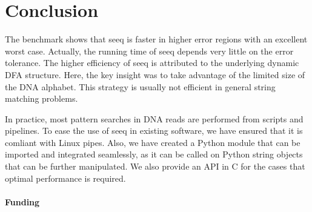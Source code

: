 \documentclass{bioinfo}
\begin{document}
\section{Conclusion}

The benchmark shows that seeq is faster in higher error regions with
an excellent worst case. Actually, the running time of seeq depends
very little on the error tolerance. The higher efficiency of seeq
is attributed to the underlying dynamic DFA structure. Here, the key
insight was to take advantage of the limited size of the DNA alphabet.
This strategy is usually not efficient in general string matching
problems.

In practice, most pattern searches in DNA reads are performed from
scripts and pipelines. To ease the use of seeq in existing software,
we have ensured that it is comliant with Linux pipes. Also, we have
created a Python module that can be imported and integrated seamlessly,
as it can be called on Python string objects that can be further
manipulated. We also provide an API in C for the cases that optimal
performance is required.


\paragraph{Funding\textcolon}



%
%
%
%
%
%
%

\end{document}
